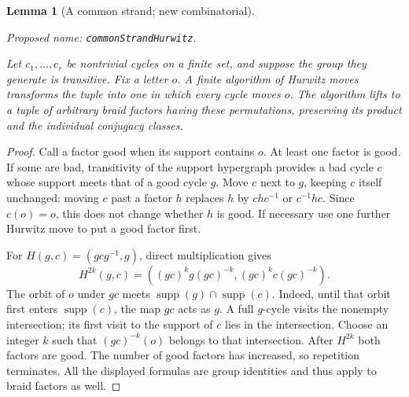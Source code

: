 \documentclass[11pt,a4paper]{article}
\newtheorem{lemma}[theorem]{Lemma}
\theoremstyle{remark}
\newcommand{\formalname}[1]{\leavevmode\par\noindent\textnormal{\small Proposed name: \texttt{#1}.}\par\smallskip}
\begin{document}
\begin{lemma}[A common strand; new combinatorial]
\label{lem:hurwitz}
\formalname{commonStrandHurwitz}
Let $c_1,\ldots,c_r$ be nontrivial cycles on a finite set, and suppose the group
they generate is transitive.  Fix a letter $o$.  A finite algorithm of Hurwitz
moves transforms the tuple into one in which every cycle moves $o$.
The algorithm lifts to a tuple of arbitrary braid factors having these
permutations, preserving its product and the individual conjugacy classes.
\end{lemma}
\begin{proof}
Call a factor good when its support contains $o$.  At least one factor is good.
If some are bad, transitivity of the support hypergraph provides a bad cycle
$c$ whose support meets that of a good cycle $g$.  Move $c$ next to $g$, keeping
$c$ itself unchanged: moving $c$ past a factor $h$ replaces $h$ by
$chc^{-1}$ or $c^{-1}hc$.  Since $c(o)=o$, this does not change whether $h$ is
good.  If necessary use one further Hurwitz move to put a good factor first.

For $H(g,c)=(gcg^{-1},g)$, direct multiplication gives
\[
 H^{2k}(g,c)=((gc)^k g(gc)^{-k},(gc)^k c(gc)^{-k}).
\]
The orbit of $o$ under $gc$ meets $\operatorname{supp}(g)\cap
\operatorname{supp}(c)$.  Indeed, until that orbit first enters
$\operatorname{supp}(c)$, the map $gc$ acts as $g$.  A full $g$-cycle visits
the nonempty intersection; its first visit to the support of $c$ lies in the
intersection.  Choose an integer $k$ such that $(gc)^{-k}(o)$ belongs to that
intersection.  After $H^{2k}$ both factors are good.  The number of good
factors has increased, so repetition terminates.  All the displayed formulas
are group identities and thus apply to braid factors as well.
\end{proof}
\end{document}
